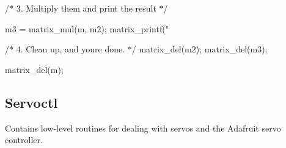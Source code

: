{\ttfamily /$\ast$ 3. Multiply them and print the result $\ast$/ \begin{DoxyVerb}m3 = matrix_mul(m, m2);
matrix_printf("%
\end{DoxyVerb}
}

{\ttfamily /$\ast$ 4. Clean up, and you\textquotesingle{}re done. $\ast$/ matrix\+\_\+del(m2); matrix\+\_\+del(m3);}

{\ttfamily  matrix\+\_\+del(m); }

\subsection*{Servoctl}

Contains low-\/level routines for dealing with servos and the Adafruit servo controller. 